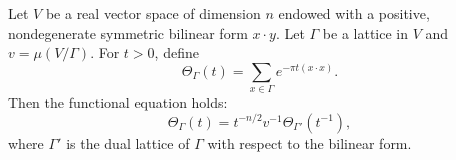 Let $V$ be a real vector space of dimension $n$ endowed with a positive, nondegenerate symmetric bilinear form $x \cdot y$. Let $\Gamma$ be a lattice in $V$ and $v = \mu(V/\Gamma)$. For $t > 0$, define
$$\Theta_\Gamma(t) = \sum_{x \in \Gamma} e^{-\pi t (x \cdot x)}.$$
Then the functional equation holds:
$$\Theta_\Gamma(t) = t^{-n/2} v^{-1} \Theta_{\Gamma'}(t^{-1}),$$
where $\Gamma'$ is the dual lattice of $\Gamma$ with respect to the bilinear form.
